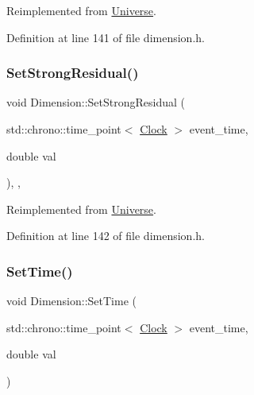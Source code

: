 Reimplemented from \hyperlink{class_universe_aafec97a231126b71c73ac1258609a284}{Universe}.



Definition at line 141 of file dimension.\+h.

\mbox{\label{class_dimension_a9bd5480b1da689cd58bf61dac7169080}} 
\subsubsection{\texorpdfstring{Set\+Strong\+Residual()}{SetStrongResidual()}}
{\footnotesize\ttfamily void Dimension\+::\+Set\+Strong\+Residual (\begin{DoxyParamCaption}\item[{std\+::chrono\+::time\+\_\+point$<$ \hyperlink{universe_8h_a0ef8d951d1ca5ab3cfaf7ab4c7a6fd80}{Clock} $>$}]{event\+\_\+time,  }\item[{double}]{val }\end{DoxyParamCaption})\hspace{0.3cm}{\ttfamily [inline]}, {\ttfamily [final]}, {\ttfamily [virtual]}}



Reimplemented from \hyperlink{class_universe_a1b2d6197ddf3d613cc30bd04d22ed8b7}{Universe}.



Definition at line 142 of file dimension.\+h.

\mbox{\label{class_dimension_a0558d45fe020ba1d1895e521a411decb}} 
\subsubsection{\texorpdfstring{Set\+Time()}{SetTime()}}
{\footnotesize\ttfamily void Dimension\+::\+Set\+Time (\begin{DoxyParamCaption}\item[{std\+::chrono\+::time\+\_\+point$<$ \hyperlink{universe_8h_a0ef8d951d1ca5ab3cfaf7ab4c7a6fd80}{Clock} $>$}]{event\+\_\+time,  }\item[{double}]{val }\end{DoxyParamCaption})}



